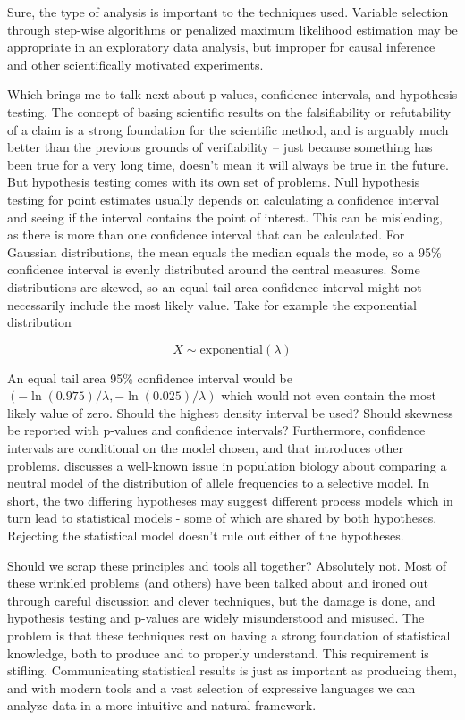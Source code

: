 \documentclass[11pt, oneside, openany]{scrbook}
\begin{document}
Sure, the type of analysis is important to the techniques used. Variable selection through step-wise algorithms or penalized maximum likelihood estimation \citep{hoerl1970ridge, tibshirani1996regression} may be appropriate in an exploratory data analysis, but improper for causal inference and other scientifically motivated experiments.

Which brings me to talk next about p-values, confidence intervals, and hypothesis testing. The concept of basing scientific results on the falsifiability \citep{popper1959logic} or refutability of a claim is a strong foundation for the scientific method, and is arguably much better than the previous grounds of verifiability -- just because something has been true for a very long time, doesn't mean it will always be true in the future. But hypothesis testing comes with its own set of problems. Null hypothesis testing for point estimates usually depends on calculating a confidence interval and seeing if the interval contains the point of interest. This can be misleading, as there is more than one confidence interval that can be calculated. For Gaussian distributions, the mean equals the median equals the mode, so a 95\% confidence interval is evenly distributed around the central measures. Some distributions are skewed, so an equal tail area confidence interval might not necessarily include the most likely value. Take for example the exponential distribution

\[
X \sim \mathrm{exponential} (\lambda)
\]

An equal tail area 95\% confidence interval would be \(\left(-\ln(0.975)/\lambda, -\ln(0.025)/\lambda\right)\) which would not even contain the most likely value of zero. Should the highest density interval be used? Should skewness be reported with p-values and confidence intervals? Furthermore, confidence intervals are conditional on the model chosen, and that introduces other problems. \citet{mcelreath2020statistical} discusses a well-known issue in population biology about comparing a neutral model of the distribution of allele frequencies to a selective model. In short, the two differing hypotheses may suggest different process models which in turn lead to statistical models - some of which are shared by both hypotheses. Rejecting the statistical model doesn't rule out either of the hypotheses.

Should we scrap these principles and tools all together? Absolutely not. Most of these wrinkled problems (and others) have been talked about and ironed out through careful discussion and clever techniques, but the damage is done, and hypothesis testing and p-values are widely misunderstood and misused. The problem is that these techniques rest on having a strong foundation of statistical knowledge, both to produce and to properly understand. This requirement is stifling. Communicating statistical results is just as important as producing them, and with modern tools and a vast selection of expressive languages we can analyze data in a more intuitive and natural framework.
\end{document}
